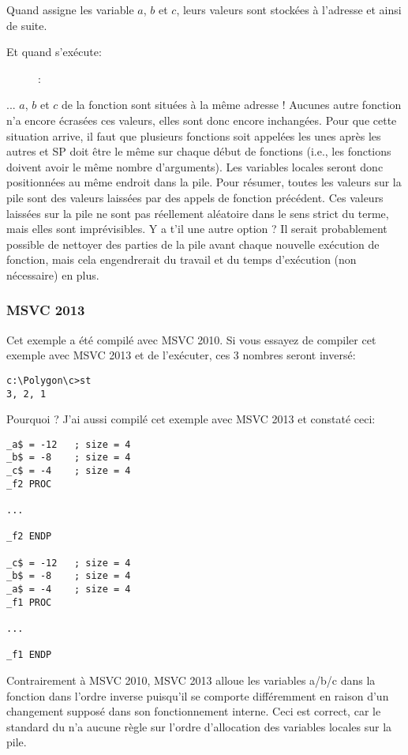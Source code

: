 Quand  assigne les variable $a$, $b$ et $c$, leurs valeurs sont stockées à l'adresse  et ainsi de suite.

\clearpage
Et quand  s'exécute:

\begin{figure}[H]
\centering
{}
\caption{\olly: }
\label{fig:stack_noise_olly2}
\end{figure}

... $a$, $b$ et $c$ de la fonction  sont situées à la même adresse !
Aucunes autre fonction n'a encore écrasées ces valeurs, elles sont donc encore inchangées. Pour que cette situation arrive, il faut que plusieurs fonctions soit appelées les unes après les autres et \ac{SP} doit être le même sur chaque début de fonctions (i.e., les fonctions doivent avoir le même nombre d'arguments). Les variables locales seront donc positionnées au même endroit dans la pile. Pour résumer, toutes les valeurs sur la pile sont des valeurs laissées par des appels de fonction précédent. Ces valeurs laissées sur la pile ne sont pas réellement aléatoire dans le sens strict du terme, mais elles sont imprévisibles.
Y a t'il une autre option ?
Il serait probablement possible de nettoyer des parties de la pile avant chaque nouvelle exécution de fonction, mais cela engendrerait du travail et du temps d'exécution (non nécessaire) en plus.

\subsubsection{MSVC 2013}

Cet exemple a été compilé avec MSVC 2010.
Si vous essayez de compiler cet exemple avec MSVC 2013 et de l'exécuter, ces 3 nombres seront inversé:%

\begin{lstlisting}
c:\Polygon\c>st
3, 2, 1
\end{lstlisting}

Pourquoi ?
J'ai aussi compilé cet exemple avec MSVC 2013 et constaté ceci: 


\begin{lstlisting}[caption=MSVC 2013,style=customasmx86]
_a$ = -12	; size = 4
_b$ = -8	; size = 4
_c$ = -4	; size = 4
_f2	PROC

...

_f2	ENDP

_c$ = -12	; size = 4
_b$ = -8	; size = 4
_a$ = -4	; size = 4
_f1	PROC

...

_f1	ENDP
\end{lstlisting}

Contrairement à MSVC 2010, MSVC 2013 alloue les variables a/b/c dans la fonction  dans l'ordre inverse puisqu'il se comporte différemment en raison d'un changement supposé dans son fonctionnement interne.%
Ceci est correct, car le standard du \CCpp n'a aucune règle sur l'ordre d'allocation des variables locales sur la pile.
